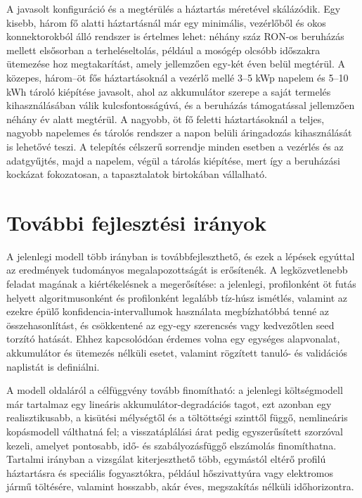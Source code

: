 A javasolt konfiguráció és a megtérülés a háztartás méretével skálázódik. Egy kisebb, három fő alatti háztartásnál már egy minimális, vezérlőből és okos konnektorokból álló rendszer is értelmes lehet: néhány száz RON-os beruházás mellett elsősorban a terheléseltolás, például a mosógép olcsóbb időszakra ütemezése hoz megtakarítást, amely jellemzően egy-két éven belül megtérül. A közepes, három--öt fős háztartásoknál a vezérlő mellé 3--5 kWp napelem és 5--10 kWh tároló kiépítése javasolt, ahol az akkumulátor szerepe a saját termelés kihasználásában válik kulcsfontosságúvá, és a beruházás támogatással jellemzően néhány év alatt megtérül. A nagyobb, öt fő feletti háztartásoknál a teljes, nagyobb napelemes és tárolós rendszer a napon belüli áringadozás kihasználását is lehetővé teszi. A telepítés célszerű sorrendje minden esetben a vezérlés és az adatgyűjtés, majd a napelem, végül a tárolás kiépítése, mert így a beruházási kockázat fokozatosan, a tapasztalatok birtokában vállalható.

\section{További fejlesztési irányok}
A jelenlegi modell több irányban is továbbfejleszthető, és ezek a lépések egyúttal az eredmények tudományos megalapozottságát is erősítenék. A legközvetlenebb feladat magának a kiértékelésnek a megerősítése: a jelenlegi, profilonként öt futás helyett algoritmusonként és profilonként legalább tíz-húsz ismétlés, valamint az ezekre épülő konfidencia-intervallumok használata megbízhatóbbá tenné az összehasonlítást, és csökkentené az egy-egy szerencsés vagy kedvezőtlen seed torzító hatását. Ehhez kapcsolódóan érdemes volna egy egységes alapvonalat, akkumulátor és ütemezés nélküli esetet, valamint rögzített tanuló- és validációs naplistát is definiálni.

A modell oldaláról a célfüggvény tovább finomítható: a jelenlegi költségmodell már tartalmaz egy lineáris akkumulátor-degradációs tagot, ezt azonban egy realisztikusabb, a kisütési mélységtől és a töltöttségi szinttől függő, nemlineáris kopásmodell válthatná fel; a visszatáplálási árat pedig egyszerűsített szorzóval kezeli, amelyet pontosabb, idő- és szabályozásfüggő elszámolás finomíthatna. Tartalmi irányban a vizsgálat kiterjeszthető több, egymástól eltérő profilú háztartásra és speciális fogyasztókra, például hőszivattyúra vagy elektromos jármű töltésére, valamint hosszabb, akár éves, megszakítás nélküli időhorizontra.

